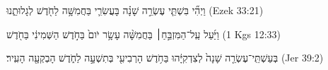 
\begin{exe}

\ex\label{ex_numsim_time1}
\texthebrew{
וַיְהִ֞י בִּשְׁתֵּ֧י עֶשְׂרֵ֣ה שָׁנָ֗ה בָּעֲשִׂרִ֛י בַּחֲמִשָּׁ֥ה לַחֹ֖דֶשׁ לְגָלוּתֵ֑נוּ 
} (Ezek 33:21)

\ex\label{ex_numsim_time2}
\texthebrew{
וַיַּ֜עַל עַֽל־הַמִּזְבֵּ֣חַ׀ בַּחֲמִשָּׁ֨ה עָשָׂ֥ר יֹום֙ בַּחֹ֣דֶשׁ הַשְּׁמִינִ֔י בַּחֹ֖דֶשׁ 
} (1 Kgs 12:33)

\ex\label{ex_numsim_time3}
\texthebrew{
בְּעַשְׁתֵּֽי־עֶשְׂרֵ֤ה שָׁנָה֙ לְצִדְקִיָּ֔הוּ בַּחֹ֥דֶשׁ הָרְבִיעִ֖י בְּתִשְׁעָ֣ה לַחֹ֑דֶשׁ הָבְקְעָ֖ה הָעִֽיר׃ 
} (Jer 39:2)

\end{exe}
